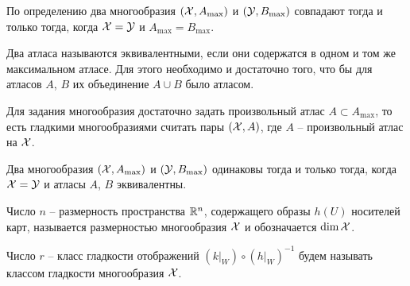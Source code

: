 	По определению два многообразия $(\mathcal{X}, A_{\max})$ и $(\mathcal{Y}, B_{\max})$ совпадают тогда и только тогда, когда $\mathcal{X} = \mathcal{Y}$ и $A_{\max} = B_{\max}$.
	
	\begin{mdef}
		Два атласа называются эквивалентными, если они содержатся в одном и том же максимальном атласе. Для этого необходимо и достаточно того, что бы для атласов $A$, $B$ их объединение $A \cup B$ было атласом. 
	\end{mdef}

	Для задания многообразия достаточно задать произвольный атлас $A \subset A_{\max}$, то есть гладкими многообразиями считать пары $(\mathcal{X}, A)$, где $A$ -- произвольный атлас на $\mathcal{X}$.
	
	Два многообразия $(\mathcal{X}, A_{\max})$ и $(\mathcal{Y}, B_{\max})$ одинаковы тогда и только тогда, когда $\mathcal{X} = \mathcal{Y}$ и атласы $A$, $B$ эквивалентны.
	
	\begin{mdef}
		Число $n$ -- размерность пространства $\mathbb{R}^n$, содержащего образы $h(U)$ носителей карт, называется размерностью многообразия $\mathcal{X}$ и обозначается $\dim \mathcal{X}$.
	\end{mdef}

	\begin{mdef}
		Число $r$ -- класс гладкости отображений $\left( \left. k \right|_W \right) \circ \left( \left. h \right|_W \right)^{-1}$ будем называть классом гладкости многообразия $\mathcal{X}$.
	\end{mdef}
	
	